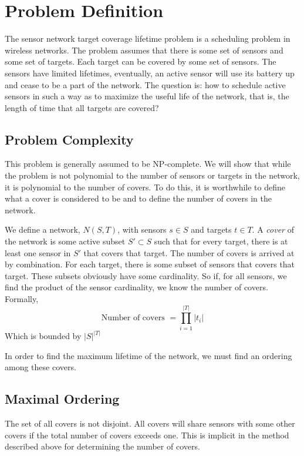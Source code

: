 


\section{Problem Definition}
The sensor network target coverage lifetime problem is a scheduling problem in wireless networks. The problem assumes that there is some set of sensors and some set of targets. Each target can be covered by some set of sensors. The sensors have limited lifetimes, eventually, an active sensor will use its battery up and cease to be a part of the network. The question is: how to schedule active sensors in such a way as to maximize the useful life of the network, that is, the length of time that all targets are covered?

\subsection{Problem Complexity}
This problem is generally assumed to be NP-complete.\cite{978-3-540-77220-0_36} We will show that while the problem is not polynomial to the number of sensors or targets in the network, it is polynomial to the number of covers. To do this, it is worthwhile to define what a cover is considered to be and to define the number of covers in the network.

We define a network, $N(S,T)$, with sensors $s \in S$ and targets $t \in T$. A {\em cover} of the network is some active subset $S' \subset S$ such that for every target, there is at least one sensor in $S'$ that covers that target. The number of covers is arrived at by combination. For each target, there is some subset of sensors that covers that target. These subsets obviously have some cardinality. So if, for all sensors, we find the product of the sensor cardinality, we know the number of covers. Formally, \begin{equation}
\text{Number of covers } = \prod_{i = 1}^{|T|} |t_i|
\end{equation}
Which is bounded by $|S|^{|T|}$

In order to find the maximum lifetime of the network, we must find an ordering among these covers. 

\subsection{Maximal Ordering}
The set of all covers is not disjoint. All covers will share sensors with some other covers if the total number of covers exceeds one. This is implicit in the method described above for determining the number of covers.

